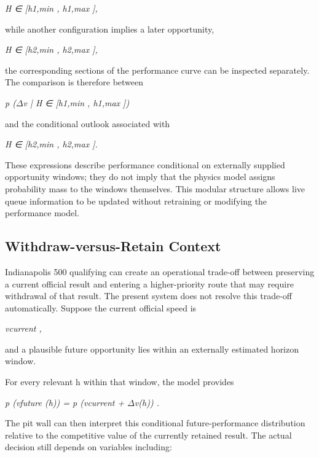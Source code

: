 \begin{center}\textit{H ∈ [h1,min , h1,max ],}\end{center}

while another configuration implies a later opportunity,

\begin{center}\textit{H ∈ [h2,min , h2,max ],}\end{center}

the corresponding sections of the performance curve can be inspected separately. The comparison is therefore between

\begin{center}\textit{p (\ensuremath{\Delta}v | H ∈ [h1,min , h1,max ])}\end{center}

and the conditional outlook associated with

\begin{center}\textit{H ∈ [h2,min , h2,max ].}\end{center}

These expressions describe performance conditional on externally supplied opportunity windows; they do not imply that the physics model assigns probability mass to the windows themselves. This modular structure allows live queue information to be updated without retraining or modifying the performance model.

\subsection{Withdraw-versus-Retain Context}
Indianapolis 500 qualifying can create an operational trade-off between preserving a current official result and entering a higher-priority route that may require withdrawal of that result. The present system does not resolve this trade-off automatically. Suppose the current official speed is

\begin{center}\textit{vcurrent ,}\end{center}

and a plausible future opportunity lies within an externally estimated horizon window.

For every relevant h within that window, the model provides

\begin{center}\textit{p (vfuture (h)) = p (vcurrent + \ensuremath{\Delta}v(h)) .}\end{center}

The pit wall can then interpret this conditional future-performance distribution relative to the competitive value of the currently retained result. The actual decision still depends on variables including:

